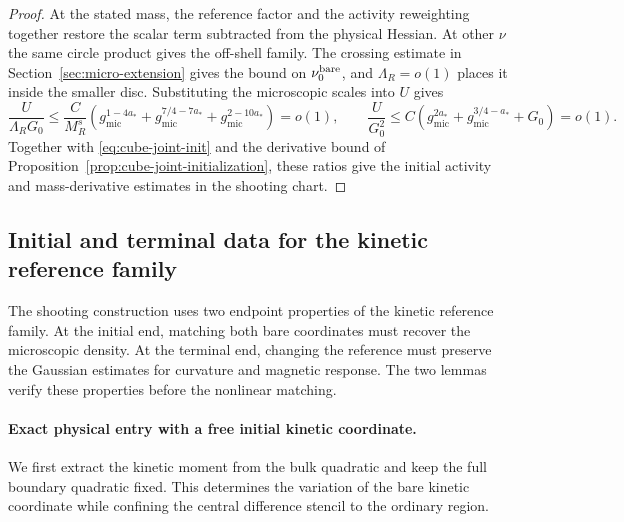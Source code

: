 \documentclass[11pt]{article}
\theoremstyle{definition}
\begin{document}
\begin{proof}
At the stated mass, the reference factor and the activity reweighting
together restore the scalar term subtracted from the physical Hessian.
At other \(\nu\) the same circle product gives the off-shell family.
The crossing estimate in Section~\ref{sec:micro-extension} gives
the bound on \(\nu_0^{\rm bare}\), and \(\Lambda_R=o(1)\) places it
inside the smaller disc. Substituting the microscopic scales into
\(U\) gives
\begin{equation}
 \frac{U}{\Lambda_R G_0}
 \le \frac{C}{M_R^s}
       \left(g_{\mathrm{mic}}^{1-4a_*}
             +g_{\mathrm{mic}}^{7/4-7a_*}
             +g_{\mathrm{mic}}^{2-10a_*}\right)=o(1),
 \qquad
 \frac{U}{G_0^2}
 \le C\left(g_{\mathrm{mic}}^{2a_*}
             +g_{\mathrm{mic}}^{3/4-a_*}+G_0\right)=o(1).
\end{equation}
Together with \eqref{eq:cube-joint-init} and the derivative bound
of Proposition~\ref{prop:cube-joint-initialization}, these ratios give
the initial activity and mass-derivative estimates in the shooting chart.
\end{proof}

\subsection{Initial and terminal data for the kinetic reference family}
\label{sec:kinetic-reference-endpoints}

The shooting construction uses two endpoint properties of the
kinetic reference family. At the initial end, matching both bare
coordinates must recover the microscopic density. At the terminal
end, changing the reference must preserve the Gaussian estimates
for curvature and magnetic response. The two lemmas verify these
properties before the nonlinear matching.

\paragraph{Exact physical entry with a free initial kinetic coordinate.}
We first extract the kinetic moment from the bulk quadratic and
keep the full boundary quadratic fixed. This determines the
variation of the bare kinetic coordinate while confining the
central difference stencil to the ordinary region.
\end{document}
